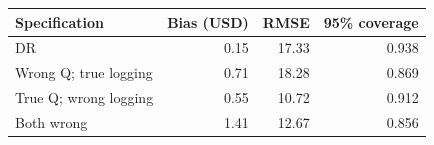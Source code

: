 \begin{tabular}{@{}lrrr@{}}
\toprule
Specification & Bias (USD) & RMSE & 95\% coverage\\
\midrule
DR & 0.15 & 17.33 & 0.938\\
Wrong Q; true logging & 0.71 & 18.28 & 0.869\\
True Q; wrong logging & 0.55 & 10.72 & 0.912\\
Both wrong & 1.41 & 12.67 & 0.856\\
\bottomrule
\end{tabular}
